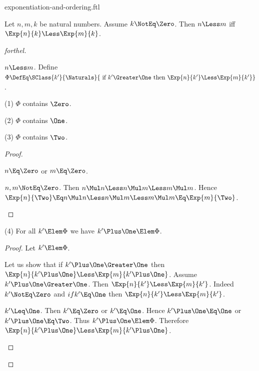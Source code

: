 \documentclass{stex}
\begin{document}
\begin{smodule}{exponentiation-and-ordering.ftl}


\begin{proposition*}[forthel]
  Let $n, m, k$ be natural numbers.
  Assume $k \NotEq \Zero$.
  Then $n \Less m$ iff $\Exp{n}{k} \Less \Exp{m}{k}$.
\end{proposition*}
\begin{proof}[forthel]
  \begin{case}{$n \Less m$.}
    Define $\Phi \DefEq \SClass{k'}{\Naturals}{\text{ if }k' \Greater \One\text{ then }\Exp{n}{k'} \Less \Exp{m}{k'}}$.

    (1) $\Phi$ contains $\Zero$.

    (2) $\Phi$ contains $\One$.

    (3) $\Phi$ contains $\Two$.
    \begin{proof}
      \begin{case}{$n \Eq \Zero$ or $m \Eq \Zero$.} \end{case}

      \begin{case}{$n, m \NotEq \Zero$.}
        Then $n \Mul n
          \Less n \Mul m
          \Less m \Mul m$.
        Hence $\Exp{n}{\Two}
          \Eq n \Mul n
          \Less n \Mul m
          \Less m \Mul m
          \Eq \Exp{m}{\Two}$.
      \end{case}
    \end{proof}

    (4) For all $k' \Elem \Phi$ we have $k' \Plus \One \Elem \Phi$.
    \begin{proof}
      Let $k' \Elem \Phi$.

      Let us show that if $k' \Plus \One \Greater \One$ then $\Exp{n}{k' \Plus \One} \Less \Exp{m}{k' \Plus \One}$.
        Assume $k' \Plus \One \Greater \One$.
        Then $\Exp{n}{k'} \Less \Exp{m}{k'}$.
        Indeed $k' \NotEq \Zero$ and $if k' \Eq \One$ then $\Exp{n}{k'} \Less \Exp{m}{k'}$.

        \begin{case}{$k' \Leq \One$.}
          Then $k' \Eq \Zero$ or $k' \Eq \One$.
          Hence $k' \Plus \One \Eq \One$ or $k' \Plus \One \Eq \Two$.
          Thus $k' \Plus \One \Elem \Phi$.
          Therefore $\Exp{n}{k' \Plus \One} \Less \Exp{m}{k' \Plus \One}$.
        \end{case}


\end{proof}
\end{case}
\end{proof}
\end{smodule}
\end{document}
